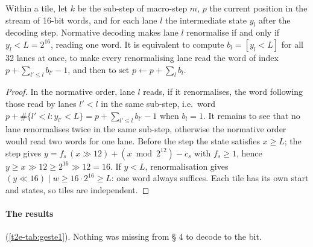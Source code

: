 \begin{lemme}\label{t2e-lem:vectorise}
Within a tile, let $k$ be the sub-step of macro-step $m$, $p$ the current position in the stream of 16-bit words, and for each lane $l$ the intermediate state $y_l$ after the decoding step. Normative decoding makes lane $l$ renormalise if and only if $y_l < L = 2^{16}$, reading one word. It is equivalent to compute $b_l = [y_l < L]$ for all 32 lanes at once, to make every renormalising lane read the word of index $p + \sum_{l' \le l} b_{l'} - 1$, and then to set $p \leftarrow p + \sum_l b_l$.
\end{lemme}
\begin{proof}
In the normative order, lane $l$ reads, if it renormalises, the word following those read by lanes $l' < l$ in the same sub-step, i.e.\ word $p + \#\{l' < l : y_{l'} < L\} = p + \sum_{l' \le l} b_{l'} - 1$ when $b_l = 1$. It remains to see that no lane renormalises twice in the same sub-step, otherwise the normative order would read two words for one lane. Before the step the state satisfies $x \ge L$; the step gives $y = f_s \,(x \gg 12) + (x \bmod 2^{12}) - c_s$ with $f_s \ge 1$, hence $y \ge x \gg 12 \ge 2^{16} \gg 12 = 16$. If $y < L$, renormalisation gives $(y \ll 16) \mid w \ge 16 \cdot 2^{16} \ge L$: one word always suffices. Each tile has its own start and states, so tiles are independent.
\end{proof}

\paragraph{The results} (\cref{t2e-tab:geste1}). Nothing was missing from § 4 to decode to the bit.

